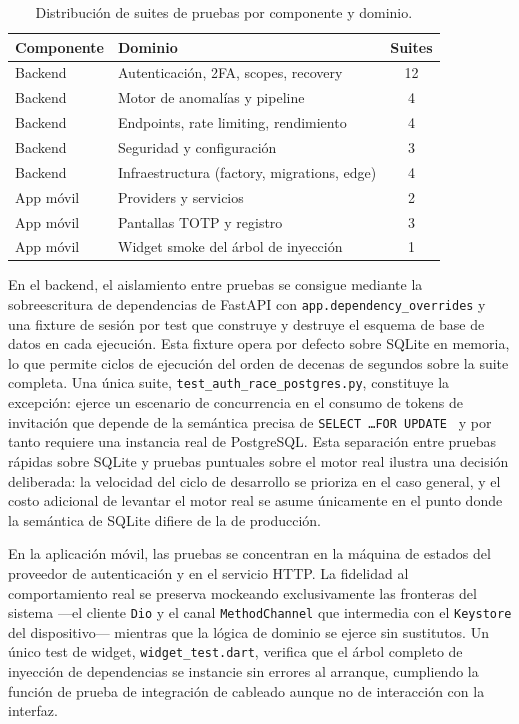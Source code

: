 \begin{table}[ht]
\centering
\caption{Distribución de suites de pruebas por componente y dominio.}
\label{tab:suites-pruebas}
\footnotesize
\begin{tabular}{@{}p{1.8cm}p{3.5cm}c@{}}
\toprule
\textbf{Componente} & \textbf{Dominio} & \textbf{Suites} \\
\midrule
Backend & Autenticación, 2FA, scopes, recovery & 12 \\[2pt]
Backend & Motor de anomalías y pipeline & 4 \\[2pt]
Backend & Endpoints, rate limiting, rendimiento & 4 \\[2pt]
Backend & Seguridad y configuración & 3 \\[2pt]
Backend & Infraestructura (factory, migrations, edge) & 4 \\[2pt]
App móvil & Providers y servicios & 2 \\[2pt]
App móvil & Pantallas TOTP y registro & 3 \\[2pt]
App móvil & Widget smoke del árbol de inyección & 1 \\
\bottomrule
\end{tabular}
\end{table}

En el backend, el aislamiento entre pruebas se consigue mediante la
sobreescritura de dependencias de FastAPI con
\texttt{app.dependency\_overrides} y una fixture de sesión por test
que construye y destruye el esquema de base de datos en cada
ejecución. Esta fixture opera por defecto sobre SQLite en memoria,
lo que permite ciclos de ejecución del orden de decenas de segundos
sobre la suite completa. Una única suite,
\texttt{test\_auth\_race\_postgres.py}, constituye la excepción:
ejerce un escenario de concurrencia en el consumo de tokens de
invitación que depende de la semántica precisa de \texttt{SELECT
\ldots FOR UPDATE}~\cite{silberschatz2018os} y por tanto requiere
una instancia real de PostgreSQL. Esta separación entre pruebas
rápidas sobre SQLite y pruebas puntuales sobre el motor real
ilustra una decisión deliberada: la velocidad del ciclo de
desarrollo se prioriza en el caso general, y el costo adicional de
levantar el motor real se asume únicamente en el punto donde la
semántica de SQLite difiere de la de producción.

En la aplicación móvil, las pruebas se concentran en la máquina de
estados del proveedor de autenticación y en el servicio HTTP. La
fidelidad al comportamiento real se preserva mockeando
exclusivamente las fronteras del sistema ---el cliente \texttt{Dio}
y el canal \texttt{MethodChannel} que intermedia con el
\texttt{Keystore} del dispositivo--- mientras que la lógica de
dominio se ejerce sin sustitutos. Un único test de widget,
\texttt{widget\_test.dart}, verifica que el árbol completo de
inyección de dependencias se instancie sin errores al arranque,
cumpliendo la función de prueba de integración de cableado aunque
no de interacción con la interfaz.

